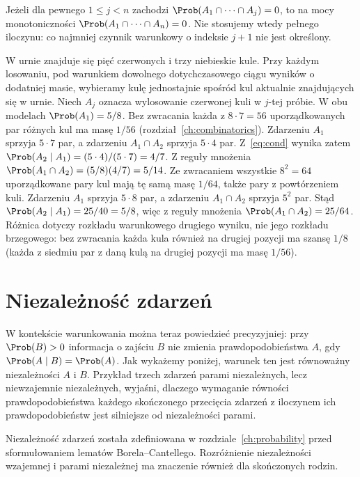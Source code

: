 \begin{uwaga}
Jeżeli dla pewnego $1\leq j<n$ zachodzi
$\Prob(A_1\cap\cdots\cap A_j)=0$, to na mocy monotoniczności
$\Prob(A_1\cap\cdots\cap A_n)=0$. Nie stosujemy wtedy pełnego
iloczynu: co najmniej czynnik warunkowy o indeksie $j+1$
nie jest określony.
\end{uwaga}

\begin{przyklad}
W urnie znajduje się pięć czerwonych i trzy niebieskie kule.
Przy każdym losowaniu, pod warunkiem dowolnego dotychczasowego
ciągu wyników o dodatniej masie, wybieramy kulę jednostajnie
spośród kul aktualnie znajdujących się w urnie. Niech $A_j$ oznacza
wylosowanie czerwonej kuli w $j$-tej próbie. W obu modelach
$\Prob(A_1)=5/8$. Bez zwracania każda z $8\cdot7=56$ uporządkowanych par
różnych kul ma masę $1/56$ (rozdział~\ref{ch:combinatorics}).
Zdarzeniu $A_1$ sprzyja $5\cdot7$ par, a zdarzeniu
$A_1\cap A_2$ sprzyja $5\cdot4$ par.
Z~\eqref{eq:cond} wynika zatem
$\Prob(A_2\mid A_1)=(5\cdot4)/(5\cdot7)=4/7$.
Z reguły mnożenia $\Prob(A_1\cap A_2)=(5/8)(4/7)=5/14$.
Ze zwracaniem wszystkie $8^2=64$ uporządkowane pary kul
mają tę samą masę $1/64$, także pary z powtórzeniem kuli.
Zdarzeniu $A_1$ sprzyja $5\cdot8$ par, a zdarzeniu
$A_1\cap A_2$ sprzyja $5^2$ par. Stąd
$\Prob(A_2\mid A_1)=25/40=5/8$, więc z reguły mnożenia
$\Prob(A_1\cap A_2)=25/64$.
Różnica dotyczy rozkładu warunkowego drugiego wyniku,
nie jego rozkładu brzegowego: bez zwracania każda kula
również na drugiej pozycji ma szansę $1/8$ (każda z siedmiu
par z daną kulą na drugiej pozycji ma masę $1/56$).
\end{przyklad}

\section{Niezależność zdarzeń}
W kontekście warunkowania można teraz powiedzieć precyzyjniej:
przy $\Prob(B)>0$ informacja o zajściu $B$ nie zmienia
prawdopodobieństwa $A$, gdy $\Prob(A\mid B)=\Prob(A)$.
Jak wykażemy poniżej, warunek ten jest równoważny
niezależności $A$ i $B$.
Przykład trzech zdarzeń parami niezależnych, lecz niewzajemnie
niezależnych, wyjaśni, dlaczego wymaganie równości
prawdopodobieństwa każdego skończonego przecięcia zdarzeń
z iloczynem ich prawdopodobieństw jest silniejsze od
niezależności parami.

Niezależność zdarzeń została zdefiniowana w rozdziale~\ref{ch:probability}
przed sformułowaniem lematów Borela--Cantellego. Rozróżnienie niezależności wzajemnej
i parami niezależnej ma znaczenie również dla skończonych rodzin.


